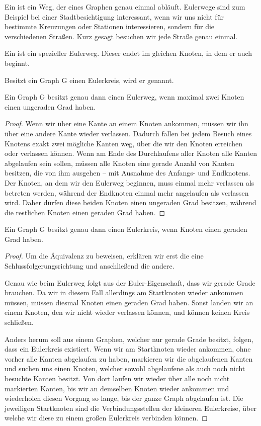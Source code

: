 Ein  ist ein Weg, der  eines Graphen genau einmal abläuft. Eulerwege sind zum Beispiel bei einer Stadtbesichtigung interessant, wenn wir uns nicht für bestimmte Kreuzungen oder Stationen interessieren, sondern für die verschiedenen Straßen. Kurz gesagt besuchen wir jede Straße genau einmal.

Ein  ist ein spezieller Eulerweg. Dieser endet im gleichen Knoten, in dem er auch beginnt.

Besitzt ein Graph G einen Eulerkreis, wird er  genannt.


\begin {fakt}
Ein Graph G besitzt genau dann einen Eulerweg, wenn maximal zwei Knoten einen ungeraden Grad haben.
\end{fakt}

\begin {proof}
Wenn wir über eine Kante an einem Knoten ankommen, müssen wir ihn über eine andere Kante wieder verlassen. Dadurch fallen bei jedem Besuch eines Knotens exakt zwei mögliche Kanten weg, über die wir den Knoten erreichen oder verlassen können. Wenn am Ende des Durchlaufens aller Knoten alle Kanten abgelaufen sein sollen, müssen alle Knoten eine gerade Anzahl von Kanten besitzen, die von ihm ausgehen -- mit Ausnahme des Anfangs- und Endknotens. Der Knoten, an dem wir den Eulerweg beginnen, muss einmal mehr verlassen als betreten werden, während der Endknoten einmal mehr angelaufen als verlassen wird. Daher dürfen diese beiden Knoten einen ungeraden Grad besitzen, während die restlichen Knoten einen geraden Grad haben.
\end {proof}

\begin {fakt}
\label{EKreis}
Ein Graph G besitzt genau dann einen Eulerkreis, wenn  Knoten einen geraden Grad haben.
\end {fakt}

\begin {proof}
Um die Äquivalenz zu beweisen, erklären wir erst die eine Schlussfolgerungsrichtung und anschließend die andere.

Genau wie beim Eulerweg folgt aus der Euler-Eigenschaft, dass wir gerade Grade brauchen. Da wir in diesem Fall allerdings am Startknoten wieder ankommen müssen, müssen diesmal \textit{} Knoten einen geraden Grad haben. Sonst landen wir an einem Knoten, den wir nicht wieder verlassen können, und können keinen Kreis schließen.

Anders herum soll aus einem Graphen, welcher nur gerade Grade besitzt, folgen, dass ein Eulerkreis existiert.
Wenn wir am Startknoten wieder ankommen, ohne vorher alle Kanten abgelaufen zu haben, markieren wir die abgelaufenen Kanten und suchen uns einen Knoten, welcher sowohl abgelaufene als auch noch nicht besuchte Kanten besitzt. Von dort laufen wir wieder über alle noch nicht markierten Kanten, bis wir an demselben Knoten wieder ankommen und wiederholen diesen Vorgang so lange, bis der ganze Graph abgelaufen ist. Die jeweiligen Startknoten sind die Verbindungsstellen der kleineren Eulerkreise, über welche wir diese zu einem großen Eulerkreis verbinden können.
\end {proof}


